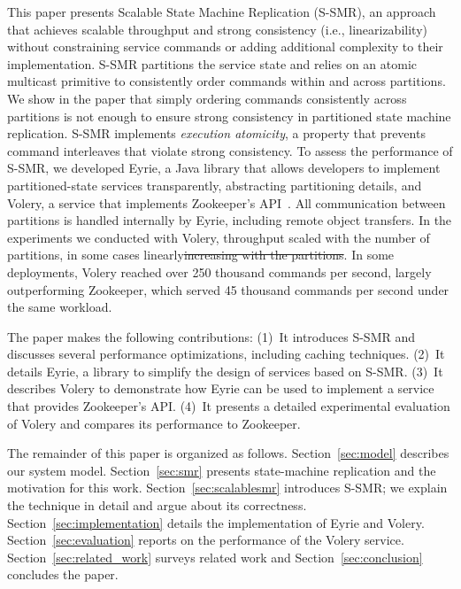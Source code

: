 \documentclass[10pt, conference, compsocconf, letterpaper]{IEEEtranv17}
\providecommand{\DIFdel}[1]{{\protect\color{red}\sout{#1}}}                      %
\providecommand{\DIFdelbegin}{} %
\providecommand{\DIFdelend}{} %
\begin{document}
This paper presents Scalable State Machine Replication (S-SMR), an approach that achieves scalable throughput and strong consistency (i.e., linearizability) without constraining service commands or adding additional complexity to their implementation.
%
S-SMR partitions the service state and relies on an atomic multicast primitive to consistently order commands within and across partitions.
We show in the paper that simply ordering commands consistently across partitions is not enough to ensure strong consistency in partitioned state machine replication.
S-SMR implements \emph{execution atomicity}, a property that prevents command interleaves that violate strong consistency. 
%
To assess the performance of S-SMR, we developed Eyrie, a Java library that allows developers to implement partitioned-state services transparently, abstracting partitioning details, and Volery, a service that implements Zookeeper's API~\cite{ZOO2010}. 
All communication between partitions is handled internally by Eyrie, including remote object transfers. 
In the experiments we conducted with Volery, throughput scaled with the number of partitions, in some cases linearly\DIFdelbegin \DIFdel{increasing with the partitions}\DIFdelend .
In some deployments, Volery reached over 250 thousand commands per second, largely outperforming Zookeeper, which served 45 thousand commands per second under the same workload.


The paper makes the following contributions: 
(1)~It introduces S-SMR and discusses several performance optimizations, including caching techniques.
(2)~It details Eyrie, a library to simplify the design of services based on S-SMR. 
(3)~It describes Volery to demonstrate how Eyrie can be used to implement a service that provides Zookeeper's API.
(4)~It presents a detailed experimental evaluation of Volery and compares its performance to Zookeeper.

The remainder of this paper is organized as follows.
Section~\ref{sec:model} describes our system model.
Section~\ref{sec:smr} presents state-machine replication and the motivation for this work.
Section~\ref{sec:scalablesmr} introduces S-SMR; we explain the technique in detail and argue about its correctness.
Section~\ref{sec:implementation} details the implementation of Eyrie and Volery.
Section~\ref{sec:evaluation} reports on the performance of the Volery service.
Section~\ref{sec:related_work} surveys related work and
Section~\ref{sec:conclusion} concludes the paper.
\end{document}
